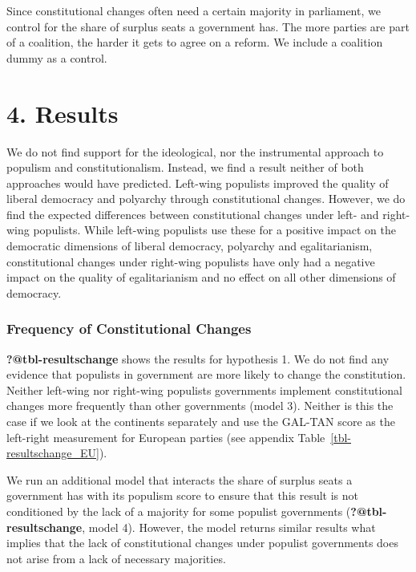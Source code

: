 \documentclass[
  abstract]{article}
\begin{document}
Since constitutional changes often need a certain majority in
parliament, we control for the share of surplus seats a government has.
The more parties are part of a coalition, the harder it gets to agree on
a reform. We include a coalition dummy as a control.

\hypertarget{results}{%
\section{4. Results}\label{results}}

We do not find support for the ideological, nor the instrumental
approach to populism and constitutionalism. Instead, we find a result
neither of both approaches would have predicted. Left-wing populists
improved the quality of liberal democracy and polyarchy through
constitutional changes. However, we do find the expected differences
between constitutional changes under left- and right-wing populists.
While left-wing populists use these for a positive impact on the
democratic dimensions of liberal democracy, polyarchy and
egalitarianism, constitutional changes under right-wing populists have
only had a negative impact on the quality of egalitarianism and no
effect on all other dimensions of democracy.

\hypertarget{frequency-of-constitutional-changes}{%
\subsubsection{Frequency of Constitutional
Changes}\label{frequency-of-constitutional-changes}}

\textbf{?@tbl-resultschange} shows the results for hypothesis 1. We do
not find any evidence that populists in government are more likely to
change the constitution. Neither left-wing nor right-wing populists
governments implement constitutional changes more frequently than other
governments (model 3). Neither is this the case if we look at the
continents separately and use the GAL-TAN score as the left-right
measurement for European parties (see appendix
Table~\ref{tbl-resultschange_EU}).

\blandscape

\elandscape

We run an additional model that interacts the share of surplus seats a
government has with its populism score to ensure that this result is not
conditioned by the lack of a majority for some populist governments
(\textbf{?@tbl-resultschange}, model 4). However, the model returns
similar results what implies that the lack of constitutional changes
under populist governments does not arise from a lack of necessary
majorities.
\end{document}
